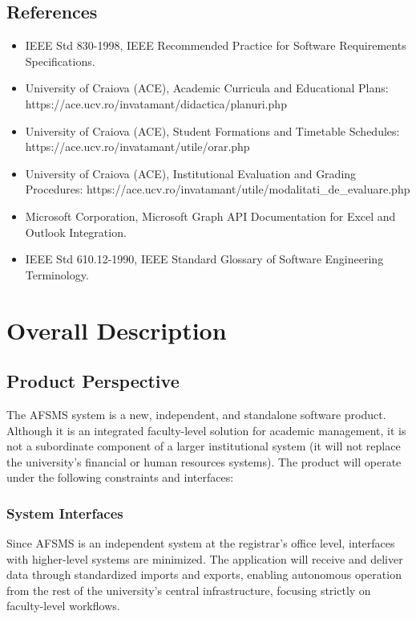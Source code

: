 \documentclass[11pt, a4paper]{article}
\begin{document}
\subsection{References}
\begin{itemize}
    \item IEEE Std 830-1998, IEEE Recommended Practice for Software Requirements Specifications.
    \item University of Craiova (ACE), Academic Curricula and Educational Plans: https://ace.ucv.ro/invatamant/didactica/planuri.php
    \item University of Craiova (ACE), Student Formations and Timetable Schedules: https://ace.ucv.ro/invatamant/utile/orar.php
    \item University of Craiova (ACE), Institutional Evaluation and Grading Procedures: https://ace.ucv.ro/invatamant/utile/modalitati_de_evaluare.php
    \item Microsoft Corporation, Microsoft Graph API Documentation for Excel and Outlook Integration.
    \item IEEE Std 610.12-1990, IEEE Standard Glossary of Software Engineering Terminology.
\end{itemize}


\section{Overall Description}

\subsection{Product Perspective}
The AFSMS system is a new, independent, and standalone software product. Although it is an integrated faculty-level solution for academic management, it is not a subordinate component of a larger institutional system (it will not replace the university's financial or human resources systems). The product will operate under the following constraints and interfaces:

\subsubsection{System Interfaces}
Since AFSMS is an independent system at the registrar's office level, interfaces with higher-level systems are minimized. The application will receive and deliver data through standardized imports and exports, enabling autonomous operation from the rest of the university's central infrastructure, focusing strictly on faculty-level workflows.
\end{document}
